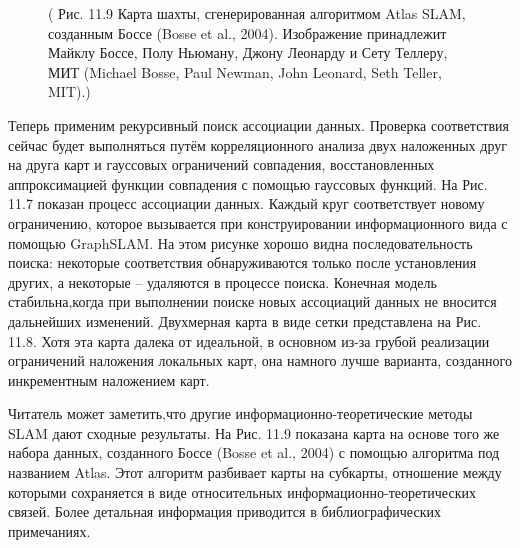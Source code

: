 \documentclass[10pt,a4paper]{article}
\begin{document}
\begin{figure}[H]
	\caption{ ( Рис. 11.9 Карта шахты, сгенерированная алгоритмом Atlas SLAM, созданным Боссе (Bosse et al., 2004). Изображение принадлежит Майклу Боссе, Полу Ньюману, Джону Леонарду и Сету Теллеру, МИТ (Michael Bosse, Paul Newman, John Leonard, Seth Teller, MIT).) }
	\label{fig:119orig}
\end{figure}

Теперь применим рекурсивный поиск ассоциации данных. Проверка соответствия сейчас будет выполняться путём корреляционного анализа двух наложенных друг на друга карт и гауссовых ограничений совпадения, восстановленных аппроксимацией функции совпадения с помощью гауссовых функций. На Рис. 11.7 показан процесс ассоциации данных. Каждый круг соответствует новому ограничению, которое вызывается при конструировании информационного вида с помощью GraphSLAM. На этом рисунке хорошо видна последовательность поиска: некоторые соответствия обнаруживаются только после установления других, а некоторые – удаляются в процессе поиска. Конечная модель стабильна,когда при выполнении поиске новых ассоциаций данных не вносится дальнейших изменений. Двухмерная карта в виде сетки представлена на Рис. 11.8. Хотя эта карта далека от идеальной, в основном из-за грубой реализации ограничений наложения локальных карт, она намного лучше варианта, созданного инкрементным наложением карт.

Читатель может заметить,что другие информационно-теоретические методы SLAM дают сходные результаты. На Рис. 11.9 показана карта на основе того же набора данных, созданного Боссе (Bosse et al., 2004) с помощью алгоритма под названием Atlas. Этот алгоритм разбивает карты на субкарты, отношение между которыми сохраняется в виде относительных информационно-теоретических связей. Более детальная информация приводится в библиографических примечаниях.\\
\end{document}
